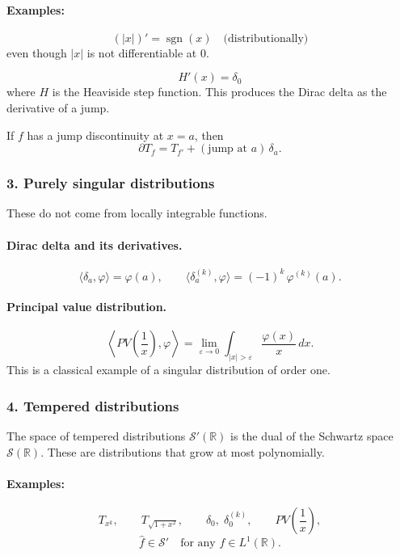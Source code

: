\documentclass[12pt,a4paper]{article}
\theoremstyle{plain}
\theoremstyle{definition}
\theoremstyle{remark}
\theoremstyle{remark}
\begin{document}
\paragraph{Examples:}
\[
(|x|)' = \operatorname{sgn}(x)
\quad\text{(distributionally)}
\]
even though $|x|$ is not differentiable at $0$.

\[
H'(x) = \delta_0
\]
where $H$ is the Heaviside step function. This produces the Dirac delta
as the derivative of a jump.

If $f$ has a jump discontinuity at $x=a$, then
\[
\partial T_f = T_{f'} + (\text{jump at }a)\,\delta_a.
\]

\subsubsection*{3. Purely singular distributions}

These do not come from locally integrable functions.

\paragraph{Dirac delta and its derivatives.}
\[
\langle \delta_a,\varphi\rangle = \varphi(a),
\qquad
\langle \delta_a^{(k)},\varphi\rangle
= (-1)^k\,\varphi^{(k)}(a).
\]

\paragraph{Principal value distribution.}
\[
\boxed{
	\left\langle PV\!\left(\frac1x\right),\varphi\right\rangle
	= \lim_{\varepsilon\to0}
	\int_{|x|>\varepsilon}\frac{\varphi(x)}{x}\,dx.
}
\]
This is a classical example of a singular distribution of order one.

\subsubsection*{4. Tempered distributions}

The space of tempered distributions $\mathcal{S}'(\mathbb{R})$ is the dual
of the Schwartz space $\mathcal{S}(\mathbb{R})$. These are distributions
that grow at most polynomially.

\paragraph{Examples:}
\[
T_{x^k},\qquad T_{\sqrt{1+x^2}},\qquad
\delta_0,\;\delta_0^{(k)},\qquad
PV\!\left(\frac1x\right),
\]
\[
\widehat{f}\in\mathcal{S}'\quad\text{for any }f\in L^1(\mathbb{R}).
\]
\end{document}
